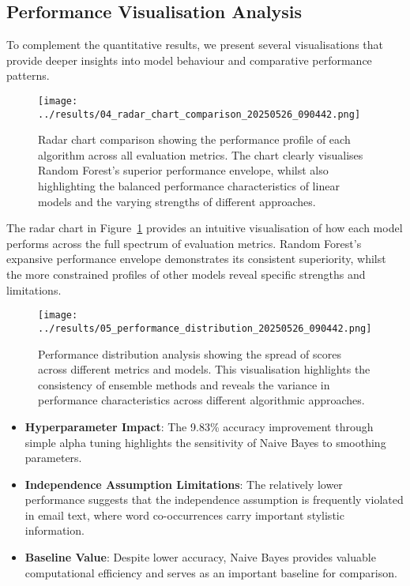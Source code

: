 \documentclass[11pt,a4paper]{article}
\begin{document}
\subsection{Performance Visualisation Analysis}

To complement the quantitative results, we present several visualisations that provide deeper insights into model behaviour and comparative performance patterns.

\begin{figure}[H]
    \centering
    \texttt{[image: ../results/04\_radar\_chart\_comparison\_20250526\_090442.png]}
    \caption{Radar chart comparison showing the performance profile of each algorithm across all evaluation metrics. The chart clearly visualises Random Forest's superior performance envelope, whilst also highlighting the balanced performance characteristics of linear models and the varying strengths of different approaches.}
    \label{fig:radar_comparison}
\end{figure}

The radar chart in Figure~\ref{fig:radar_comparison} provides an intuitive visualisation of how each model performs across the full spectrum of evaluation metrics. Random Forest's expansive performance envelope demonstrates its consistent superiority, whilst the more constrained profiles of other models reveal specific strengths and limitations.

\begin{figure}[H]
    \centering
    \texttt{[image: ../results/05\_performance\_distribution\_20250526\_090442.png]}
    \caption{Performance distribution analysis showing the spread of scores across different metrics and models. This visualisation highlights the consistency of ensemble methods and reveals the variance in performance characteristics across different algorithmic approaches.}
    \label{fig:performance_distribution}
\end{figure}

\begin{itemize}
    \item \textbf{Hyperparameter Impact}: The 9.83\% accuracy improvement through simple alpha tuning highlights the sensitivity of Naive Bayes to smoothing parameters.
    
    \item \textbf{Independence Assumption Limitations}: The relatively lower performance suggests that the independence assumption is frequently violated in email text, where word co-occurrences carry important stylistic information.
    
    \item \textbf{Baseline Value}: Despite lower accuracy, Naive Bayes provides valuable computational efficiency and serves as an important baseline for comparison.
\end{itemize}
\end{document}
